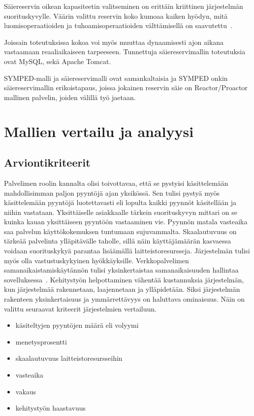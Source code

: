 \documentclass[finnish]{tktltiki2}
\theoremstyle{definition}
\theoremstyle{remark}
\begin{document}
Säiereservin oikean kapasiteetin valitseminen on erittäin kriittinen
järjestelmän suorituskyvylle.
Väärin valittu reservin koko kumoaa kaiken hyödyn, mitä luomisoperaatioiden
ja tuhoamisoperaatioiden välttämisellä on saavutettu~\cite{ling_analysis_2000}.

Joissain toteutuksissa kokoa voi myös muuttaa dynaamisesti ajon aikana vastaamaan
reaaliaikaiseen tarpeeseen.
Tunnettuja säiereservimallin toteutuksia ovat MySQL, sekä Apache Tomcat.

SYMPED-malli ja säiereservimalli ovat samankaltaisia ja SYMPED onkin 
säiereservimallin erikoistapaus, joissa jokainen reservin säie on
Reactor/Proactor mallinen palvelin,
joiden välillä työ jaetaan. 

\section{Mallien vertailu ja analyysi}
\subsection{Arviontikriteerit}
Palvelimen roolin kannalta olisi toivottavaa, että
se pystyisi käsittelemään mahdollisimman paljon pyyntöjä
ajan yksikössä. Sen tulisi pystyä myös käsittelemään pyyntöjä
luotettavasti eli lopulta kaikki pyynnöt käsitellään ja niihin vastataan.
Yksittäiselle asiakkaalle tärkein suorituskyvyn mittari on se kuinka kauan
yksittäiseen pyyntöön vastaaminen vie. Pyynnön matala vasteaika saa
palvelun käyttökokemuksen tuntumaan sujuvammalta.
Skaalautuvuus on tärkeää palvelinta ylläpitävälle taholle, sillä
näin käyttäjämäärän kasvaessa voidaan suorituskykyä parantaa
lisäämällä laitteistoresursseja. Järjestelmän tulisi myös
olla vastustuskykyinen hyökkäyksille.
Verkkopalvelimen samanaikaistamiskäytännön tulisi
yksinkertaistaa samanaikaisuuden hallintaa sovelluksessa~\cite{pyarali_proactor_1997}.
Kehitystyön helpottaminen vähentää kustannuksia
järjestelmän, kun järjestelmää rakennetaan, laajennetaan ja ylläpidetään.
Siksi järjestelmän rakenteen yksinkertaisuus ja
ymmärrettävyys on haluttava ominaisuus.
Näin on valittu seuraavat kriteerit 
järjestelmien vertailuun.
\begin{itemize}
    \item käsiteltyjen pyyntöjen määrä eli volyymi
    \item menetysprosentti
    \item skaalautuvuus laitteistoresursseihin
    \item vasteaika
    \item vakaus
    \item kehitystyön haastavuus
\end{itemize}
\end{document}
